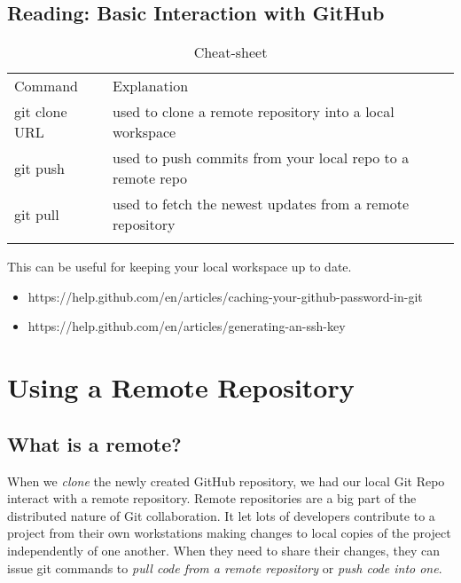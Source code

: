 	\subsection{Reading: Basic Interaction with GitHub} \label{W301d}
	
	\begin{table}
		\caption{Cheat-sheet}
		\label{tab:W301d}       %
		\begin{tabular}{p{3cm}p{8cm}}
			\hline\noalign{\smallskip}
			Command & Explanation \\
			\noalign{\smallskip}\svhline\noalign{\smallskip}
			git clone URL & used to clone a remote repository into a local workspace \\
			git push & used to push commits from your local repo to a remote repo \\
			git pull & used to fetch the newest updates from a remote repository \\
			\noalign{\smallskip}\hline\noalign{\smallskip}
		\end{tabular}
	\end{table}
	This can be useful for keeping your local workspace up to date.
	
	\begin{itemize}
		\item https://help.github.com/en/articles/caching-your-github-password-in-git
	
		\item https://help.github.com/en/articles/generating-an-ssh-key  
		
	\end{itemize}

\section{Using a Remote Repository} \label{W302}

	\subsection{What is a remote?} \label{W302a}
	When we \textit{clone} the newly created GitHub repository, we had our local Git Repo interact with a remote repository. 
	Remote repositories are a big part of the distributed nature of Git collaboration. 
	It let lots of developers contribute to a project from their own workstations making changes to local copies of the project independently of one another. 
	When they need to share their changes, they can issue git commands to \textit{pull code from a remote repository} or \textit{push code into one}. 
	
